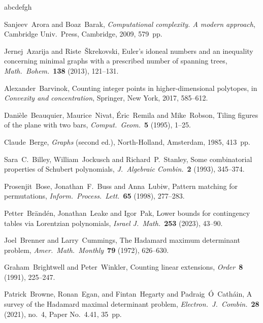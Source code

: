\documentclass[11pt]{amsart}
\theoremstyle{definition}
\numberwithin{figure}{section}
\numberwithin{equation}{section}
\begin{document}
{\footnotesize
	
\begin{thebibliography}{abcdefgh}

Sanjeev~Arora and Boaz~Barak, \emph{Computational complexity. A modern approach},
Cambridge Univ.\ Press, Cambridge, 2009, 579~pp.


Jernej~Azarija and Riste~\v{S}krekovski,
Euler's idoneal numbers and an inequality concerning minimal
graphs with a prescribed number of spanning trees,
\emph{Math.\ Bohem.}~\textbf{138} (2013), 121--131.

Alexander~Barvinok, Counting integer points in higher-dimensional polytopes,
in  \emph{Convexity and concentration}, Springer, New York, 2017, 585--612.

Dani\`ele~Beauquier, Maurice~Nivat, \'Eric~Remila and Mike~Robson,
Tiling figures of the plane with two bars,
\emph{Comput.\ Geom.}~\textbf{5} (1995), 1--25.

Claude~Berge, \emph{Graphs} (second ed.),
North-Holland, Amsterdam, 1985, 413~pp.

Sara~C.~Billey, William~Jockusch and Richard~P.~Stanley,
Some combinatorial properties of Schubert polynomials,
\emph{J.~Algebraic Combin.}~\textbf{2} (1993), 345--374.

Prosenjit~Bose, Jonathan~F.~Buss and Anna~Lubiw,
Pattern matching for permutations,
\emph{Inform.\ Process.\ Lett.}~\textbf{65} (1998), 277--283.

Petter~Br\"and\'en, Jonathan~Leake and Igor~Pak,
Lower bounds for contingency tables via Lorentzian polynomials,
\emph{Israel J.\ Math.}~\textbf{253} (2023), 43--90.

Joel~Brenner and Larry~Cummings, The Hadamard maximum determinant problem,
\emph{Amer.\ Math.\ Monthly}~\textbf{79} (1972), 626--630.

Graham~Brightwell and Peter~Winkler,
Counting linear extensions,
\emph{Order}~\textbf{8} (1991), 225--247.

Patrick~Browne, Ronan~Egan, and Fintan~Hegarty  and
Padraig~\'{O}~Cath\'{a}in,
A survey of the Hadamard maximal determinant problem,
\emph{Electron.\ J.\ Combin.}~\textbf{28} (2021), no.~4,
Paper No.~4.41, 35~pp.


\end{thebibliography}}
\end{document}
